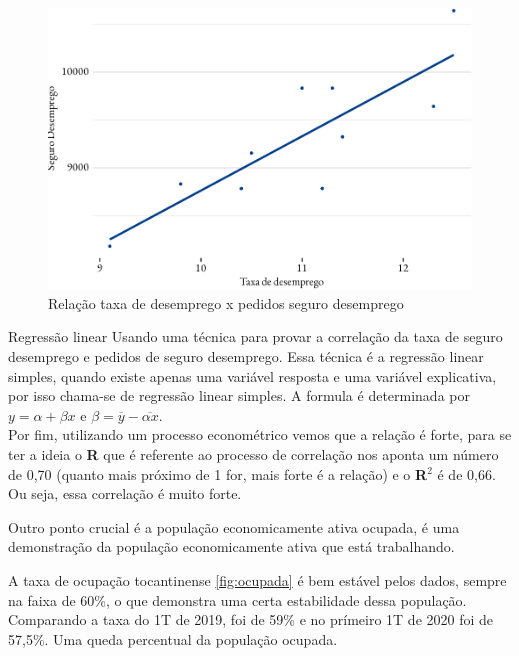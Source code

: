 \begin{figure}[h]
	\caption{Relação taxa de desemprego x pedidos seguro desemprego}
	\includegraphics[width=\linewidth]{fig/reg_emprego-2.pdf}
\end{figure}
\begin{smbox}[label={labelbox},nameref={Desigualdade por gênero}]{Regressão linear}
	Usando uma técnica para provar a correlação da taxa de seguro desemprego e pedidos de seguro desemprego. Essa técnica é a regressão linear simples, quando existe apenas uma variável resposta e uma variável explicativa, por isso chama-se de regressão linear simples. A formula é determinada por $y = \alpha + \beta x$ e $\beta = \overline{y} - \overline{\alpha x}$.
	\\
	Por fim, utilizando um processo econométrico vemos que a relação é forte, para se ter a ideia o \textbf{R} que é referente ao processo de correlação nos aponta um número de 0,70 (quanto mais próximo de 1 for, mais forte é a relação) e o \textbf{R}$^{2}$ é de 0,66. Ou seja, essa correlação é muito forte. 
\end{smbox}



\par Outro ponto crucial é a população economicamente ativa ocupada, é uma demonstração da população economicamente ativa que está trabalhando.



\par  A taxa de ocupação tocantinense \ref{fig:ocupada} é bem estável pelos dados, sempre na faixa de 60\%, o que demonstra uma certa estabilidade dessa população. Comparando a taxa do 1T de 2019, foi de 59\% e no prímeiro 1T de 2020 foi de 57,5\%. Uma queda percentual da população ocupada.



